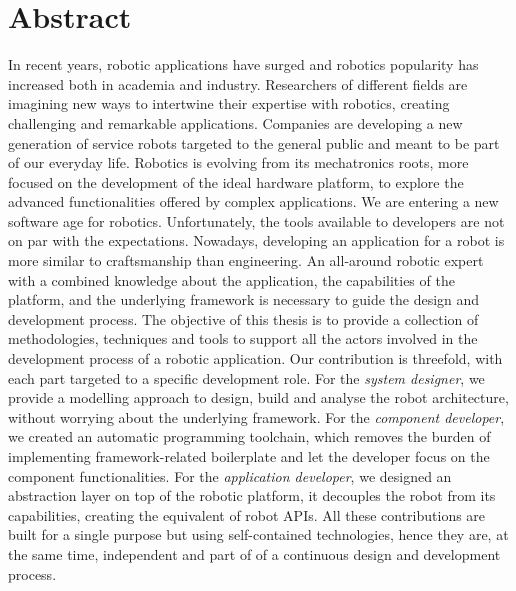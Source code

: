 \begingroup
\let\clearpage\relax
\let\cleardoublepage\relax
\let\cleardoublepage\relax

\chapter*{Abstract}
In recent years, robotic applications have surged and robotics popularity has increased both in academia and industry. Researchers of different fields are imagining new ways to intertwine their expertise with robotics, creating challenging and remarkable applications. Companies are developing a new generation of service robots targeted to the general public and meant to be part of our everyday life. Robotics is evolving from its mechatronics roots, more focused on the development of the ideal hardware platform, to explore the advanced functionalities offered by complex applications. We are entering a new software age for robotics. Unfortunately, the tools available to developers are not on par with the expectations. Nowadays, developing an application for a robot is more similar to craftsmanship than engineering. An all-around robotic expert with a combined knowledge about the application, the capabilities of the platform, and the underlying framework is necessary to guide the design and development process. The objective of this thesis is to provide a collection of methodologies, techniques and tools to support all the actors involved in the development process of a robotic application. Our contribution is threefold, with each part targeted to a specific development role. For the \textit{system designer}, we provide a modelling approach to design, build and analyse the robot architecture, without worrying about the underlying framework. For the \textit{component developer}, we created an automatic programming toolchain, which removes the burden of implementing framework-related boilerplate and let the developer focus on the component functionalities. For the \textit{application developer}, we designed an abstraction layer on top of the robotic platform, it decouples the robot from its capabilities, creating the equivalent of robot APIs. All these contributions are built for a single purpose but using self-contained technologies, hence they are, at the same time, independent and part of of a continuous design and development process.





\endgroup

\vfill
